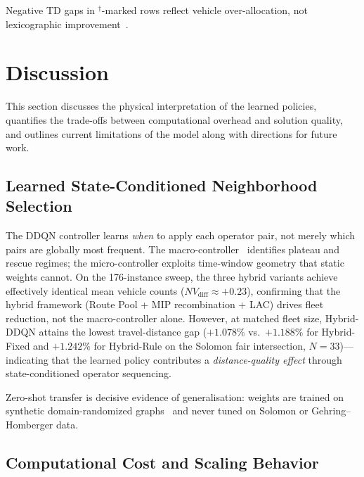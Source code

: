 \documentclass[journal]{IEEEtran}
\begin{document}
\begin{table}[!t]
\centering

\end{table}

Negative TD gaps in ${}^\dagger$-marked rows reflect vehicle over-allocation, not lexicographic
improvement~\cite{pisinger2007general}.


\section{Discussion}
\label{sec:discussion}

This section discusses the physical interpretation of the learned policies, quantifies the trade-offs between computational overhead and solution quality, and outlines current limitations of the model along with directions for future work.

\subsection{Learned State-Conditioned Neighborhood Selection}

The DDQN controller learns \emph{when} to apply each operator pair, not merely
which pairs are globally most frequent.  The macro-controller~\cite{wang2016dueling}
identifies plateau and rescue regimes; the micro-controller exploits
time-window geometry that static weights cannot.  On the 176-instance sweep,
the three hybrid variants achieve effectively identical mean vehicle counts
($NV_{\text{diff}}\approx +0.23$), confirming that the hybrid framework
(Route Pool + MIP recombination + LAC) drives fleet reduction, not the
macro-controller alone.  However, at matched fleet size, Hybrid-DDQN attains
the lowest travel-distance gap ($+1.078\%$ vs.\ $+1.188\%$ for Hybrid-Fixed
and $+1.242\%$ for Hybrid-Rule on the Solomon fair intersection,
$N{=}33$)---indicating that the learned policy contributes a
\emph{distance-quality effect} through state-conditioned operator sequencing.

Zero-shot transfer is decisive evidence of generalisation: weights are trained on
synthetic domain-randomized graphs~\cite{tobin2017domain} and never tuned on
Solomon or Gehring--Homberger data.

\subsection{Computational Cost and Scaling Behavior}
\end{document}
